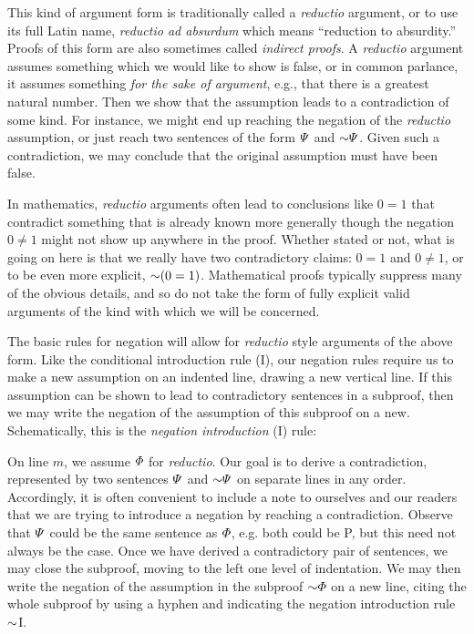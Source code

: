 This kind of argument form is traditionally called a \emph{reductio} argument, or to use its full Latin name, \emph{reductio ad absurdum} which means ``reduction to absurdity.''
Proofs of this form are also sometimes called \textit{indirect proofs}.
A \emph{reductio} argument assumes something which we would like to show is false, or in common parlance, it assumes something \textit{for the sake of argument}, e.g., that there is a greatest natural number.
Then we show that the assumption leads to a contradiction of some kind.
For instance, we might end up reaching the negation of the \textit{reductio} assumption, or just reach two sentences of the form $\varPsi$ and $\enot\metaB$.
Given such a contradiction, we may conclude that the original assumption must have been false.

In mathematics, \textit{reductio} arguments often lead to conclusions like $0=1$ that contradict something that is already known more generally though the negation $0\neq 1$ might not show up anywhere in the proof.
Whether stated or not, what is going on here is that we really have two contradictory claims: $0=1$ and $0\neq 1$, or to be even more explicit, $\enot(0=1)$.
Mathematical proofs typically suppress many of the obvious details, and so do not take the form of fully explicit valid arguments of the kind with which we will be concerned.

The basic rules for negation will allow for \textit{reductio} style arguments of the above form.
Like the conditional introduction rule (\eif I), our negation rules require us to make a new assumption on an indented line, drawing a new vertical line.
If this assumption can be shown to lead to contradictory sentences in a subproof, then we may write the negation of the assumption of this subproof on a new.
Schematically, this is the \textit{negation introduction} ({\enot}I) rule:



On line $m$, we assume $\varPhi$ for \emph{reductio}.
Our goal is to derive a contradiction, represented by two sentences $\varPsi$ and $\enot\metaB$ on separate lines in any order.
Accordingly, it is often convenient to include a note to ourselves and our readers that we are trying to introduce a negation by reaching a contradiction.
Observe that $\varPsi$ could be the same sentence as $\varPhi$, e.g. both could be P, but this need not always be the case. 
Once we have derived a contradictory pair of sentences, we may close the subproof, moving to the left one level of indentation.
We may then write the negation of the assumption in the subproof $\enot\metaA$ on a new line, citing the whole subproof by using a hyphen and indicating the negation introduction rule $\enot$I.

